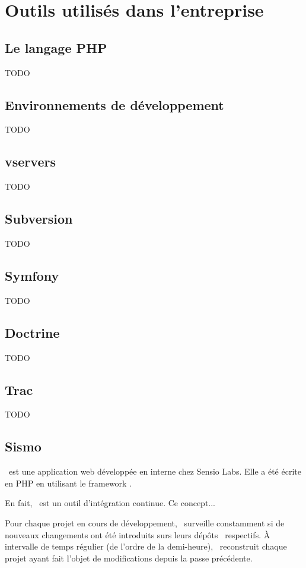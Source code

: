 \section{Outils utilisés dans l'entreprise}

\subsection{Le langage PHP}

TODO

\subsection{Environnements de développement}

TODO

\subsection{vservers}

TODO

\subsection{Subversion}


TODO

\subsection{Symfony}


TODO

\subsection{Doctrine}

TODO

\subsection{Trac}

TODO

\subsection{Sismo}

\asismo\ est une application web développée en interne chez Sensio Labs. Elle a été écrite en PHP en utilisant le framework \asf.

En fait, \asismo\ est un outil d'intégration continue. Ce concept...

Pour chaque projet en cours de développement, \asismo\ surveille constamment si de nouveaux changements ont été introduits surs leurs dépôts \asvn\ respectifs. À intervalle de temps régulier (de l'ordre de la demi-heure), \asismo\ reconstruit chaque projet ayant fait l'objet de modifications depuis la passe précédente.
